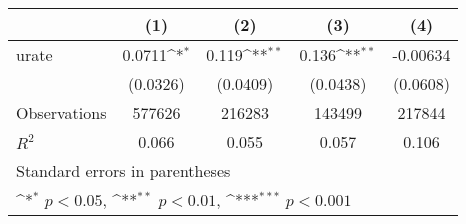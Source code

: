 {
\def\sym#1{\ifmmode^{#1}\else\(^{#1}\)\fi}
\begin{tabular}{l*{4}{c}}
\hline\hline
                    &\multicolumn{1}{c}{(1)}&\multicolumn{1}{c}{(2)}&\multicolumn{1}{c}{(3)}&\multicolumn{1}{c}{(4)}\\
\hline
urate               &      0.0711\sym{*}  &       0.119\sym{**} &       0.136\sym{**} &    -0.00634         \\
                    &    (0.0326)         &    (0.0409)         &    (0.0438)         &    (0.0608)         \\
\hline
Observations        &      577626         &      216283         &      143499         &      217844         \\
\(R^{2}\)           &       0.066         &       0.055         &       0.057         &       0.106         \\
\hline\hline
\multicolumn{5}{l}{\footnotesize Standard errors in parentheses}\\
\multicolumn{5}{l}{\footnotesize \sym{*} \(p<0.05\), \sym{**} \(p<0.01\), \sym{***} \(p<0.001\)}\\
\end{tabular}
}
